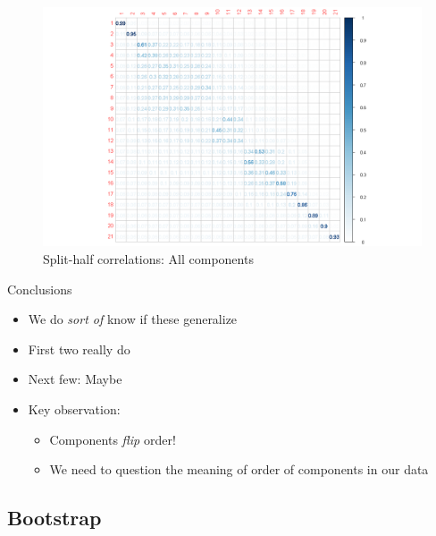 \documentclass[
  ignorenonframetext,
]{beamer}
\providecommand{\tightlist}{%
  \setlength{\itemsep}{0pt}\setlength{\parskip}{0pt}}
\begin{document}
\begin{frame}

\begin{figure}
\centering
\includegraphics{../Images/split4.png}
\caption{Split-half correlations: All components}
\end{figure}

\end{frame}

\begin{frame}{Conclusions}
\protect\hypertarget{conclusions-1}{}

\begin{itemize}[<+->]
\tightlist
\item
  We do \emph{sort of} know if these generalize
\item
  First two really do
\item
  Next few: Maybe
\item
  Key observation:

  \begin{itemize}[<+->]
  \tightlist
  \item
    Components \emph{flip} order!
  \item
    We need to question the meaning of order of components in our data
  \end{itemize}
\end{itemize}

\end{frame}

\hypertarget{bootstrap}{%
\subsection{Bootstrap}\label{bootstrap}}
\end{document}
